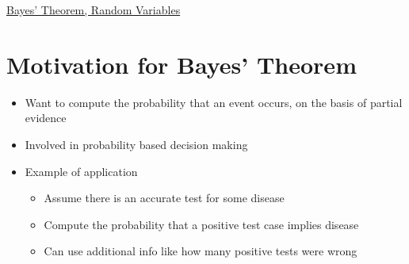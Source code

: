 \documentclass{article}[18pt]
\begin{document}
\begin{center}
\underline{\huge Bayes' Theorem, Random Variables}
\end{center}
\section{Motivation for Bayes' Theorem}
\begin{itemize}
	\item Want to compute the probability that an event occurs, on the basis of partial evidence
	\item Involved in probability based decision making
	\item Example of application
	\begin{itemize}
		\item Assume there is an accurate test for some disease
		\item Compute the probability that a positive test case implies disease
		\item Can use additional info like how many positive tests were wrong
	\end{itemize}
\end{itemize}
\end{document}
